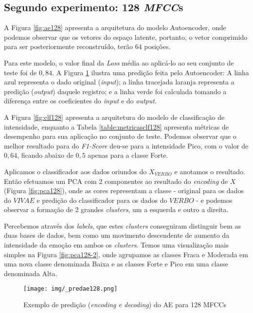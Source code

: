 \subsection{Segundo experimento: 128 \textit{MFCC}s}

A Figura \ref{fig:ae128} apresenta a arquitetura do modelo Autoencoder, onde podemos observar que os vetores do espaço latente, portanto, o vetor comprimido para ser posteriormente reconstruído, terão $64$ posições.

Para este modelo, o valor final da \textit{Loss} média ao aplicá-lo ao seu conjunto de teste foi de $0,84$. A Figura \ref{fig:predae128} ilustra uma predição feita pelo Autoencoder: A linha azul representa o dado original (\textit{input}); a linha tracejada laranja representa a predição (\textit{output}) daquele registro; e a linha verde foi calculada tomando a diferença entre os coeficientes do \textit{input} e do \textit{output}.

A Figura \ref{fig:clf128} apresenta a arquitetura do modelo de classificação de intensidade, enquanto a Tabela \ref{table:metricasclf128} apresenta métricas de desempenho para sua aplicação no conjunto de teste. Podemos observar que o melhor resultado para do \textit{F1-Score} deu-se para a intensidade Pico, com o valor de $0,64$, ficando abaixo de $0,5$ apenas para a classe Forte.

Aplicamos o classificador aos dados oriundos do $X_{VERBO}$ e anotamos o resultado. Então efetuamos um \acrshort{PCA} com 2 componentes ao resultado do \textit{encoding} de $X$ (Figura \ref{fig:pca128}), onde as cores representam a classe - original para os dados do $VIVAE$ e predição do classificador para os dados do $VERBO$ - e podemos observar a formação de 2 grandes \textit{clusters}, um a esquerda e outro a direita.

Percebemos através dos \textit{labels}, que estes \textit{clusters} conseguiram distinguir bem as duas bases de dados, bem como um movimento descendente de aumento da intensidade da emoção em ambos os \textit{clusters}. Temos uma visualização mais simples na Figura \ref{fig:pca128-2}, onde agrupamos as classes Fraca e Moderada em uma nova classe denominada Baixa e as classes Forte e Pico em uma classe denominada Alta.

    \begin{figure}%
    \centering
    \texttt{[image: img/\_predae128.png]}
    \caption{\label{fig:predae128}Exemplo de predição (\textit{encoding e decoding}) do \acrshort{AE} para 128 \acrshort{MFCC}s}
\end{figure}

